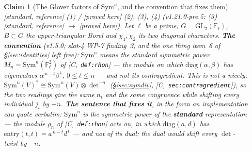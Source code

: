 \documentclass[11pt]{article}
\newtheorem{claim}[theorem]{Claim}
\theoremstyle{remark}
\newcommand{\F}{\mathbb{F}}
\newcommand{\GL}{\mathrm{GL}}
\newcommand{\Sym}{\mathrm{Sym}}
\newcommand{\Fl}{\F_\ell}
\newcommand{\Mn}{M_n}
\newcommand{\HA}[1]{[C,~\texttt{#1}]}      %
\newcommand{\PROVED}{\textsf{[proved here]}}
\newcommand{\STD}{\textsf{[standard, reference]}}
\begin{document}
\begin{claim}[The Glover factors of $\Sym^n$, and the convention that fixes them]\label{cl:glover}
\STD{} (1) / \PROVED{} (2), (3), (4) (v1.21.0-pre.5: (3) \STD{} $\to$ \PROVED).
Let $\ell$ be a prime, $G=\GL_2(\Fl)$, $B\subset G$ the upper-triangular Borel and
$\chi_1,\chi_2$ its two diagonal characters. \textbf{The convention} (v1.5.0; slot-4 WP-7
finding~3, and the one thing item~6 of \S\ref{sec:identities} left free): \emph{$\Sym^n$
means the standard symmetric power} $\Mn=\Sym^n(\Fl^{2})$ of \HA{def:rhon} --- the module
on which $\mathrm{diag}(\alpha,\beta)$ has eigenvalues $\alpha^{\,n-t}\beta^{\,t}$,
$0\le t\le n$ --- and \emph{not} its contragredient. This is not a nicety:
$\Sym^n(V)^{\ast}\cong\Sym^n(V)\otimes\det^{-n}$ (\S\ref{sec:symdiv},
\HA{sec:contragredient}), so the two readings give the same $n_i$ and the same congruence
while shifting every individual $j_i$ by $-n$. \textbf{The sentence that fixes it}, in the
form an implementation can quote verbatim: \emph{$\Sym^n$ is the symmetric power of the \textbf{standard}
representation --- the module $\rho_n$ of \HA{def:rhon} acts on, in which
$\mathrm{diag}(a,d)$ has $\mathrm{entry}(t,t)=a^{\,n-t}d^{\,t}$ --- and not of its dual; the
dual would shift every $\det$-twist by $-n$.}


\end{claim}
\end{document}
